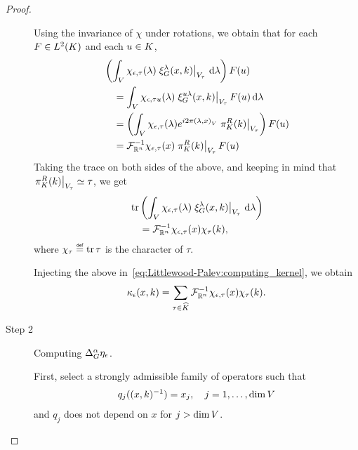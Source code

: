 \begin{proof}
\begin{description}
            Using the invariance of $\chi$ under rotations,
            we obtain that
            for each $F \in \Lebesgue 2 \CompactGroup$ and each $u \in \CompactGroup$,
            \begin{align*}
                &\left(\int_\VectorSpace \chi_{\epsilon, \tau} (\lambda) \eval {\Rep \lambda(x, k)} {V_\tau} \dd \lambda\right) F(u)\\
                &\quad = \int_\VectorSpace \chi_{\epsilon, \tau u} (\lambda) \eval {\Rep {u \lambda}(x, k)} {V_\tau} F(u) \dd \lambda\\
                &\quad = \left(\int_\VectorSpace \chi_{\epsilon, \tau} (\lambda) \e^{\i \turn \ip \lambda x} \eval {\RightRegularRepresentation(k)} {V_\tau}\right) F(u)\\
                &\quad = \InverseFourier [\R^n] \chi_{\epsilon, \tau}(x) \eval {\RightRegularRepresentation(k)} {V_\tau} F(u)
            \end{align*}
            Taking the trace on both sides of the above,
            and keeping in mind that $\eval {\RightRegularRepresentation(k)} {V_\tau} \simeq \tau$,
            we get
            \begin{align*}
                &\tr \left(\int_\VectorSpace \chi_{\epsilon, \tau} (\lambda) \eval {\Rep \lambda(x, k)} {V_\tau} \dd \lambda\right)\\
                &\quad = \InverseFourier [\R^n] \chi_{\epsilon, \tau}(x) \chi_\tau(k),
            \end{align*}
            where $\chi_\tau \defeq \tr \tau$ is the character of $\tau$.

            Injecting the above in~\eqref{eq:Littlewood-Paley:computing_kernel},
            we obtain
            \begin{align}
                \kappa_\epsilon(x, k)
                = \sum_{\tau \in \dualGroup \CompactGroup}
                \InverseFourier [\R^n] \chi_{\epsilon, \tau}(x) \chi_\tau(k).
                \label{eq:Littlewood-Paley:kernel}
            \end{align}
        \item [Step 2] Computing $\DifferenceOperatorOrder \alpha \eta_\epsilon$.

            First, select a strongly admissible family of operators such that
            \begin{align*}
                q_j((x, k)^{-1}) = x_j, \quad j = 1, \dots, \dim \VectorSpace
            \end{align*}
            and $q_j$ does not depend on $x$ for $j > \dim \VectorSpace$.


\end{description}
\end{proof}
